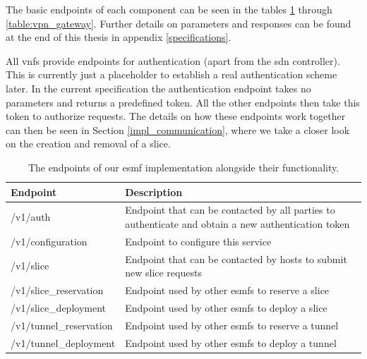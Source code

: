 The basic endpoints of each component can be seen in the tables \ref{table:esmf} through \ref{table:vpn_gateway}. Further details on parameters and responses can be found at the end of this thesis in appendix \ref{specifications}.

All \acrshort{vnf}s provide endpoints for authentication (apart from the \acrshort{sdn} controller). This is currently just a placeholder to establish a real authentication scheme later. In the current specification the authentication endpoint takes no parameters and returns a predefined token. All the other endpoints then take this token to authorize requests. The details on how these endpoints work together can then be seen in Section \ref{impl_communication}, where we take a closer look on the creation and removal of a slice.

\begin{table}[htp]
    \begin{tabularx}{\textwidth}{ |l|X| }
        \hline
        \textbf{Endpoint}       & \textbf{Description}                                                                                \\
        \hline
        /v1/auth                & Endpoint that can be contacted by all parties to authenticate and obtain a new authentication token \\
        /v1/configuration       & Endpoint to configure this service                                                                  \\
        \hline
        /v1/slice               & Endpoint that can be contacted by hosts to submit new slice requests                                \\
        \hline
        /v1/slice\_reservation  & Endpoint used by other \acrshort{esmf}s to reserve a slice                                          \\
        /v1/slice\_deployment   & Endpoint used by other \acrshort{esmf}s to deploy a slice                                           \\
        /v1/tunnel\_reservation & Endpoint used by other \acrshort{esmf}s to reserve a tunnel                                         \\
        /v1/tunnel\_deployment  & Endpoint used by other \acrshort{esmf}s to deploy a tunnel                                          \\
        \hline
    \end{tabularx}
    \caption[\acrshort{esmf} endpoints]{The endpoints of our \acrshort{esmf} implementation alongside their functionality.}
    \label{table:esmf}
\end{table}

